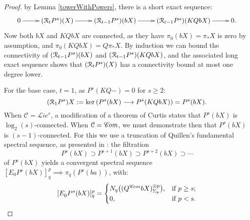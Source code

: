 \documentclass[11pt]{amsart} \renewcommand{\baselinestretch}{1.2}
\theoremstyle{plain}
\numberwithin{equation}{section} %
\theoremstyle{plain}
\numberwithin{equation}{chapter} %
\renewcommand{\ker}{\mathrm{ker}\,}
\newcommand{\DASH}{\mathrm{-}}
\renewcommand{\to}{\longrightarrow}
\newcommand{\scrL}{\mathscr{L}}
\newcommand{\scrC}{\mathscr{C}}
\newcommand{\calR}{\mathcal{R}}
\newcommand{\calc}{\mathcal{C}}
\newcommand{\citeBOX}[2][]{\cite[\mbox{#1}]{#2}}
\newcommand{\algs}{{\scrC\!\textit{\normalfont\textit{om}}}}
\newcommand{\restliealgs}{{\scrL\!\textit{ie}^\textit{r}}}
\newcommand{\algcat}{{\calc}}%
\newcommand{\E}[5]{[E^{#1}_{#2}#3]^{#4}_{#5}}
\newcommand{\caldup}[1]{\calR_{\smash{#1}}}
\newcommand{\barConstructionMightAbbreviate}{b}
\begin{document}
\begin{Bousfield-Kan spectral sequence}
\begin{proof}
by Lemma \ref{towerWithPowers}, there is a short exact sequence:
\[\xymatrix{
0\ar[r]&
(\caldup{t}P^{s})(X)\ar[r]&
(\caldup{t-1}P^{s})(\barConstructionMightAbbreviate X)\ar[r]&
(\caldup{t-1}P^{s})(KQ\barConstructionMightAbbreviate X)\ar[r]&
0.
}\]
Now both $\barConstructionMightAbbreviate X$ and $KQ\barConstructionMightAbbreviate X$ are connected, as they have $\pi_0(\barConstructionMightAbbreviate X)=\pi_*X$ is zero by assumption, and $\pi_0(KQ\barConstructionMightAbbreviate X)=Q\pi_*X$. By induction we can bound the connectivity of $(\caldup{t-1}P^{s})(\barConstructionMightAbbreviate X)$ and $(\caldup{t-1}P^{s})(KQ\barConstructionMightAbbreviate X)$, and the associated long exact sequence shows that $(\caldup{t}P^{s})(X)$ has a connectivity bound at most one degree lower.


For the base case, $t=1$, as $P^s(KQ\DASH)=0$ for $s\geq2$:
\[(\caldup{1}P^{s})X:=\ker(P^{s}(\barConstructionMightAbbreviate X)\to P^{s}(KQ\barConstructionMightAbbreviate X))=P^{s}(\barConstructionMightAbbreviate X).\]
When $\algcat=\restliealgs$, a modification \citeBOX[4.3]{6Author.pdf} of a theorem of Curtis \citeBOX[\S5]{Curtis_LCS.pdf} states that $P^{s}(\barConstructionMightAbbreviate X)$ is $\log_2(s)$-connected.
When $\algcat=\algs$, we must demonstrate then that $P^s(\barConstructionMightAbbreviate X)$ is $(s-1)$-connected. For this
 we use a truncation of Quillen's fundamental spectral sequence, as presented in \cite[Theorem 6.2]{MR1089001}: the filtration
\[P^s(\barConstructionMightAbbreviate X)\supset P^{s+1}(\barConstructionMightAbbreviate X)\supset P^{s+2}(\barConstructionMightAbbreviate X)\supset\cdots \]
of $P^s(\barConstructionMightAbbreviate X)$ yields a convergent spectral sequence  $\E{}{0}{P^s(\barConstructionMightAbbreviate X)}{p}{q}\implies \pi_q(P^s(\barConstructionMightAbbreviate a))$, with:
\[\E{}{0}{P^s(\barConstructionMightAbbreviate X)}{p}{q}=
\begin{cases}
N_q\bigl((Q^{\algs}\barConstructionMightAbbreviate X)^{\otimes p}_{\Sigma_p}\bigr),&\textup{if }p\geq s;\\
0,&\textup{if }p<s.
\end{cases}\]

\end{proof}
\end{Bousfield-Kan spectral sequence}
\end{document}
